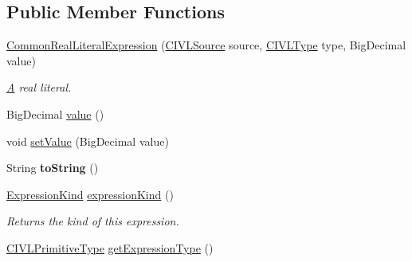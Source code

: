 \subsection*{Public Member Functions}
\begin{DoxyCompactItemize}
\item 
\hyperlink{classedu_1_1udel_1_1cis_1_1vsl_1_1civl_1_1model_1_1common_1_1expression_1_1CommonRealLiteralExpression_a7c7e8ab7168a95237fb2448870243eaf}{Common\+Real\+Literal\+Expression} (\hyperlink{interfaceedu_1_1udel_1_1cis_1_1vsl_1_1civl_1_1model_1_1IF_1_1CIVLSource}{C\+I\+V\+L\+Source} source, \hyperlink{interfaceedu_1_1udel_1_1cis_1_1vsl_1_1civl_1_1model_1_1IF_1_1type_1_1CIVLType}{C\+I\+V\+L\+Type} type, Big\+Decimal value)
\begin{DoxyCompactList}\small\item\em \hyperlink{structA}{A} real literal. \end{DoxyCompactList}\item 
Big\+Decimal \hyperlink{classedu_1_1udel_1_1cis_1_1vsl_1_1civl_1_1model_1_1common_1_1expression_1_1CommonRealLiteralExpression_a477a5be481776091df0a6b6acbb63e53}{value} ()
\item 
void \hyperlink{classedu_1_1udel_1_1cis_1_1vsl_1_1civl_1_1model_1_1common_1_1expression_1_1CommonRealLiteralExpression_a9bbeecf2924566ea0e97a9b443ceb82d}{set\+Value} (Big\+Decimal value)
\item 
\hypertarget{classedu_1_1udel_1_1cis_1_1vsl_1_1civl_1_1model_1_1common_1_1expression_1_1CommonRealLiteralExpression_ac584caa661e08e32364f00ee89995a2d}{}String {\bfseries to\+String} ()\label{classedu_1_1udel_1_1cis_1_1vsl_1_1civl_1_1model_1_1common_1_1expression_1_1CommonRealLiteralExpression_ac584caa661e08e32364f00ee89995a2d}

\item 
\hyperlink{enumedu_1_1udel_1_1cis_1_1vsl_1_1civl_1_1model_1_1IF_1_1expression_1_1Expression_1_1ExpressionKind}{Expression\+Kind} \hyperlink{classedu_1_1udel_1_1cis_1_1vsl_1_1civl_1_1model_1_1common_1_1expression_1_1CommonRealLiteralExpression_ad871c030a6277bbf83da8b17edcfec58}{expression\+Kind} ()
\begin{DoxyCompactList}\small\item\em Returns the kind of this expression. \end{DoxyCompactList}\item 
\hypertarget{classedu_1_1udel_1_1cis_1_1vsl_1_1civl_1_1model_1_1common_1_1expression_1_1CommonRealLiteralExpression_a68ad892351ec558acaef931be8859c6b}{}\hyperlink{interfaceedu_1_1udel_1_1cis_1_1vsl_1_1civl_1_1model_1_1IF_1_1type_1_1CIVLPrimitiveType}{C\+I\+V\+L\+Primitive\+Type} \hyperlink{classedu_1_1udel_1_1cis_1_1vsl_1_1civl_1_1model_1_1common_1_1expression_1_1CommonRealLiteralExpression_a68ad892351ec558acaef931be8859c6b}{get\+Expression\+Type} ()\label{classedu_1_1udel_1_1cis_1_1vsl_1_1civl_1_1model_1_1common_1_1expression_1_1CommonRealLiteralExpression_a68ad892351ec558acaef931be8859c6b}


\end{DoxyCompactItemize}
